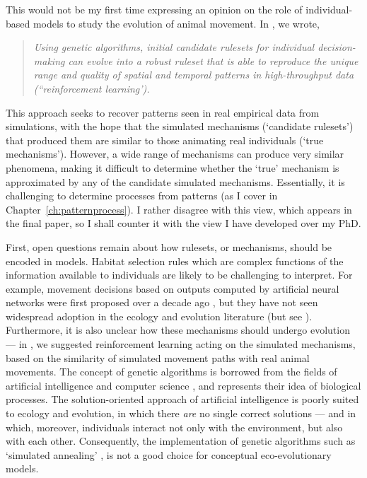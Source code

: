 This would not be my first time expressing an opinion on the role of individual-based models to study the evolution of animal movement.
In \textcite{nathan2022}, we wrote,
\begin{quotation}
    \emph{
        Using genetic algorithms, initial candidate rulesets for individual decision-making can evolve into a robust ruleset that is able to reproduce the unique range and quality of spatial and temporal patterns in high-throughput data (``reinforcement learning').
    }
\end{quotation}
This approach seeks to recover patterns seen in real empirical data from simulations, with the hope that the simulated mechanisms (`candidate rulesets') that produced them are similar to those animating real individuals (`true mechanisms').
However, a wide range of mechanisms can produce very similar phenomena, making it difficult to determine whether the `true' mechanism is approximated by any of the candidate simulated mechanisms.
Essentially, it is challenging to determine processes from patterns (as I cover in Chapter~\ref{ch:patternprocess}).
I rather disagree with this view, which appears in the final paper, so I shall counter it with the view I have developed over my PhD.

First, open questions remain about how rulesets, or mechanisms, should be encoded in models.
Habitat selection rules which are complex functions of the information available to individuals are likely to be challenging to interpret.
For example, movement decisions based on outputs computed by artificial neural networks were first proposed over a decade ago \parencite{mueller2011}, but they have not seen widespread adoption in the ecology and evolution literature (but see \cite{netz2021}).
Furthermore, it is also unclear how these mechanisms should undergo evolution --- in \textcite{nathan2022}, we suggested reinforcement learning acting on the simulated mechanisms, based on the similarity of simulated movement paths with real animal movements.
The concept of genetic algorithms is borrowed from the fields of artificial intelligence and computer science \parencite{deangelis2019}, and represents their idea of biological processes.
The solution-oriented approach of artificial intelligence is poorly suited to ecology and evolution, in which there \textit{are} no single correct solutions --- and in which, moreover, individuals interact not only with the environment, but also with each other.
Consequently, the implementation of genetic algorithms such as `simulated annealing' \parencite{getz2015}, is not a good choice for conceptual eco-evolutionary models.

